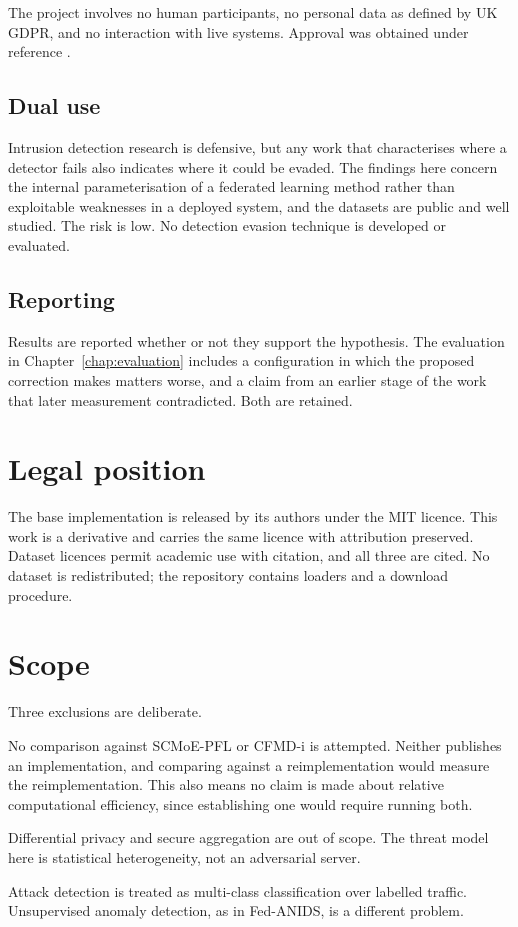 The project involves no human participants, no personal data as defined by UK
GDPR, and no interaction with live systems. Approval was obtained under
reference .

\subsection{Dual use}

Intrusion detection research is defensive, but any work that characterises
where a detector fails also indicates where it could be evaded. The findings
here concern the internal parameterisation of a federated learning method
rather than exploitable weaknesses in a deployed system, and the datasets are
public and well studied. The risk is low. No detection evasion technique is
developed or evaluated.

\subsection{Reporting}

Results are reported whether or not they support the hypothesis. The evaluation
in Chapter~\ref{chap:evaluation} includes a configuration in which the proposed
correction makes matters worse, and a claim from an earlier stage of the work
that later measurement contradicted. Both are retained.

\section{Legal position}
\label{sec:legal}

The base implementation is released by its authors under the MIT licence. This
work is a derivative and carries the same licence with attribution preserved.
Dataset licences permit academic use with citation, and all three are cited.
No dataset is redistributed; the repository contains loaders and a download
procedure.

\section{Scope}
\label{sec:scope}

Three exclusions are deliberate.

No comparison against SCMoE-PFL or CFMD-i is attempted. Neither publishes an
implementation, and comparing against a reimplementation would measure the
reimplementation. This also means no claim is made about relative computational
efficiency, since establishing one would require running both.

Differential privacy and secure aggregation are out of scope. The threat model
here is statistical heterogeneity, not an adversarial server.

Attack detection is treated as multi-class classification over labelled
traffic. Unsupervised anomaly detection, as in Fed-ANIDS, is a different
problem.
